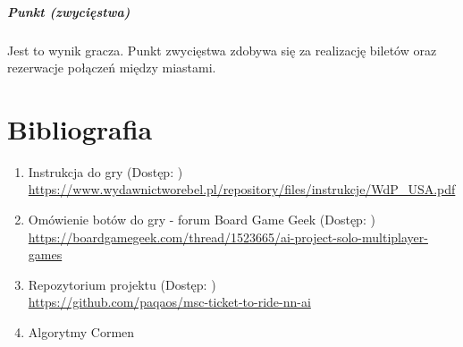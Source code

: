 \documentclass[12pt, oneside]{report}
\begin{document}
\paragraph{Punkt (zwycięstwa)} Jest to wynik gracza. Punkt zwycięstwa zdobywa się za realizację biletów oraz rezerwacje połączeń między miastami.
\chapter{Bibliografia}
\begin{enumerate}
	\item{Instrukcja do gry}
	\subitem (Dostęp: ) \\ \url{https://www.wydawnictworebel.pl/repository/files/instrukcje/WdP_USA.pdf}
	\item{Omówienie botów do gry - forum Board Game Geek}
	\subitem (Dostęp: ) \\ 
	\url{https://boardgamegeek.com/thread/1523665/ai-project-solo-multiplayer-games}
	\item{Repozytorium projektu}
	\subitem(Dostęp: ) \\ \url{https://github.com/paqaos/msc-ticket-to-ride-nn-ai}
	\item{Algorytmy}
	\subitem Cormen
\end{enumerate}
\listoffigures
\listoftables
\end{document}
